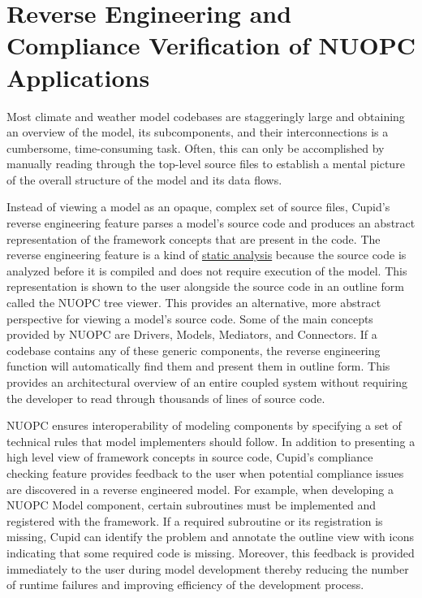 \documentclass[oneside,11pt]{memoir}
\begin{document}
\chapter{Reverse Engineering and Compliance Verification of NUOPC Applications}

Most climate and weather model codebases are staggeringly large and obtaining an overview of the model, its subcomponents, and their interconnections is a cumbersome, time-consuming task. Often, this can only be accomplished by manually reading through the top-level source files to establish a mental picture of the overall structure of the model and its data flows. 

Instead of viewing a model as an opaque, complex set of source files, Cupid's reverse engineering feature parses a model's source code and produces an abstract representation of the framework concepts that are present in the code. The reverse engineering feature is a kind of \href{http://en.wikipedia.org/wiki/Static_program_analysis}{static analysis} because the source code is analyzed before it is compiled and does not require execution of the model.  This representation is shown to the user alongside the source code in an outline form called the NUOPC tree viewer. This provides an alternative, more abstract perspective for viewing a model's source code. Some of the main concepts provided by NUOPC are Drivers, Models, Mediators, and Connectors. If a codebase contains any of these generic components, the reverse engineering function will automatically find them and present them in outline form. This provides an architectural overview of an entire coupled system without requiring the developer to read through thousands of lines of source code.

NUOPC ensures interoperability of modeling components by specifying a set of technical rules that model implementers should follow.  In addition to presenting a high level view of framework concepts in source code, Cupid's compliance checking feature provides feedback to the user when potential compliance issues are discovered in a reverse engineered model. For example, when developing a NUOPC Model component, certain subroutines must be implemented and registered with the framework. If a required subroutine or its registration is missing, Cupid can identify the problem and annotate the outline view with icons indicating that some required code is missing. Moreover, this feedback is provided immediately to the user during model development thereby reducing the number of runtime failures and improving efficiency of the development process.
\end{document}
